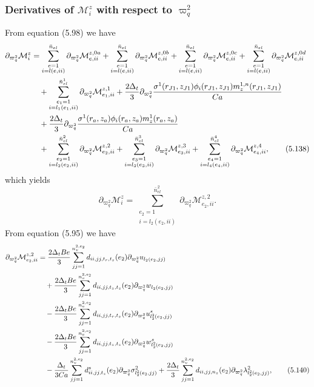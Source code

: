 \documentclass{article}
\begin{document}
\subsubsection{Derivatives of $\mathcal{M}_i^z$ with respect to $\varpi_q^2$} %
From equation (5.98) we have
\begin{align}
\partial_{\varpi_q^2}\mathcal{M}_i^z &= \sum_{\substack{e=1\\ i=l(e,ii)}}^{\bar{n}_{el}} \partial_{\varpi_q^2} \mathcal{M}_{e,ii}^{z,0a} + \sum_{\substack{e=1\\ i=l(e,ii)}}^{\bar{n}_{el}} \partial_{\varpi_q^2} \mathcal{M}_{e,ii}^{z,0b} + \sum_{\substack{e=1\\ i=l(e,ii)}}^{\bar{n}_{el}} \partial_{\varpi_q^2} \mathcal{M}_{e,ii}^{z,0c} + \sum_{\substack{e=1\\ i=l(e,ii)}}^{\bar{n}_{el}} \partial_{\varpi_q^2} \mathcal{M}_{e,ii}^{z,0d} \nonumber\\
&\quad + \sum_{\substack{e_1=1\\ i=l_1(e_1,ii)}}^{\bar{n}_{el}^1} \partial_{\varpi_q^2} \mathcal{M}_{e_1,ii}^{z,1} + \frac{2\Delta_t}{3} \partial_{\varpi_q^2} \frac{\sigma^1(r_{J1},z_{J1}) \phi_i(r_{J1},z_{J1}) m_z^{1,n}(r_{J1},z_{J1})}{Ca} \nonumber\\
&\quad + \frac{2\Delta_t}{3} \partial_{\varpi_q^2} \frac{\sigma^1(r_a,z_a) \phi_i(r_a,z_a) m_z^{1}(r_a,z_a)}{Ca} \nonumber\\
&\quad + \sum_{\substack{e_2=1\\ i=l_2(e_2,ii)}}^{\bar{n}_{el}^2} \partial_{\varpi_q^2} \mathcal{M}_{e_2,ii}^{z,2} + \sum_{\substack{e_3=1\\ i=l_3(e_3,ii)}}^{\bar{n}_{el}^3} \partial_{\varpi_q^2} \mathcal{M}_{e_3,ii}^{z,3} + \sum_{\substack{e_4=1\\ i=l_4(e_4,ii)}}^{\bar{n}_{el}^4} \partial_{\varpi_q^2} \mathcal{M}_{e_4,ii}^{z,4}, \tag{5.138}
\end{align}
which yields
\begin{equation}
\partial_{\varpi_q^2}\mathcal{M}_i^z = \sum_{\substack{e_2=1\\ i=l_2(e_2,ii)}}^{\bar{n}_{el}^2} \partial_{\varpi_q^2} \mathcal{M}_{e_2,ii}^{z,2}. \tag{5.139}
\end{equation}
From equation (5.95) we have
\begin{align}
\partial_{\varpi_q^2}\mathcal{M}_{e_2,ii}^{z,2} &= \frac{2\Delta_t Be}{3} \sum_{jj=1}^{n_v^{2,e_2}} d_{ii,jj,t_r,t_z}(e_2) \partial_{\varpi_q^2} u_{l_2(e_2,jj)} \nonumber\\
&\quad + \frac{2\Delta_t Be}{3} \sum_{jj=1}^{n_v^{2,e_2}} d_{ii,jj,t_z,t_z}(e_2) \partial_{\varpi_q^2} w_{l_2(e_2,jj)} \nonumber\\
&\quad - \frac{2\Delta_t Be}{3} \sum_{jj=1}^{n_v^{2,e_2}} d_{ii,jj,t_r,t_z}(e_2) \partial_{\varpi_q^2} u_{l_2^2(e_2,jj)}^s \nonumber\\
&\quad - \frac{2\Delta_t Be}{3} \sum_{jj=1}^{n_v^{2,e_2}} d_{ii,jj,t_z,t_z}(e_2) \partial_{\varpi_q^2} w_{l_2^2(e_2,jj)}^s \nonumber\\
&\quad - \frac{\Delta_t}{3Ca} \sum_{jj=1}^{n_v^{2,e_2}} d_{ii,jj,t_z}^s(e_2) \partial_{\varpi_q^2} \sigma_{l_2^2(e_2,jj)}^2 + \frac{2\Delta_t}{3} \sum_{jj=1}^{n_v^{2,e_2}} d_{ii,jj,n_z}(e_2) \partial_{\varpi_q^2} \lambda_{l_2^2(e_2,jj)}^2, \tag{5.140}
\end{align}
\end{document}
